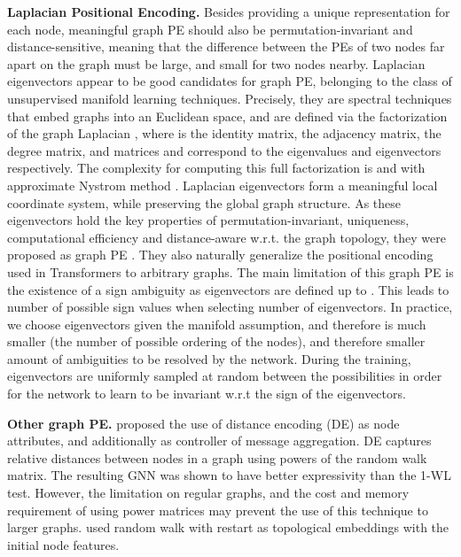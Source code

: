 \documentclass{article} \usepackage{iclr2021_conference,times}
\begin{document}
{\bf Laplacian Positional Encoding.} Besides providing a unique representation for each node, meaningful graph PE should also be  permutation-invariant and distance-sensitive, meaning that the difference between the PEs of two nodes far apart on the graph must be large, and small for two nodes nearby. Laplacian eigenvectors \citep{belkin2003laplacian} appear to be good candidates for graph PE, belonging to the class of unsupervised manifold learning techniques. Precisely, they are spectral techniques that embed graphs into an Euclidean space, and are defined via the factorization of the graph Laplacian ,  
where  is the  identity matrix,  the  adjacency matrix,  the  degree matrix, and  matrices  and  correspond to the eigenvalues and eigenvectors respectively. The complexity for computing this full factorization is  and  with approximate Nystrom method \citep{fowlkes2004spectral}. Laplacian eigenvectors form a meaningful local coordinate system, while preserving the global graph structure. As these eigenvectors hold the key properties of permutation-invariant, uniqueness, computational efficiency and distance-aware w.r.t. the graph topology, they were proposed as graph PE \citep{dwivedi2020benchmarking,dwivedi2021generalization}. They also naturally generalize the positional encoding used in  Transformers \citep{vaswani2017attention} to arbitrary graphs. The main limitation of this graph PE is the existence of a sign ambiguity as eigenvectors are defined up to . This leads to  number of possible sign values when selecting  number of eigenvectors. In practice, we choose  eigenvectors given the manifold assumption, and therefore  is much smaller  (the number of possible ordering of the nodes), and therefore smaller amount of ambiguities to be resolved by the network. During the training, eigenvectors are uniformly sampled at random between the  possibilities \citep{dwivedi2020benchmarking, kreuzer2021rethinking} in order for the network to learn to be invariant w.r.t the sign of the eigenvectors.


{\bf Other graph PE.} \cite{li2020distance} proposed the use of distance encoding (DE) as node attributes, and additionally as controller of message aggregation. DE captures relative distances between nodes in a graph using powers of the random walk matrix. The resulting GNN was shown to have better expressivity than the 1-WL test. However, the limitation on regular graphs, and the cost and memory requirement of using power matrices may prevent the use of this technique to larger graphs. \cite{Khasahmadi2020Memory-Based} used random walk with restart \citep{pan2004automatic} as topological embeddings with the initial node features.
\end{document}
